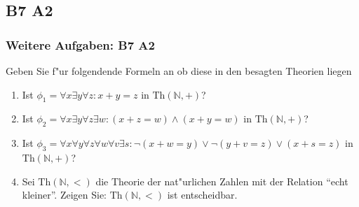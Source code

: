 \subsection{B7 A2}
\begin{frame}
	\frametitle{Weitere Aufgaben: B7 A2}
	Geben Sie f"ur folgendende Formeln an ob diese in den besagten Theorien liegen
	\begin{enumerate}
		\item Ist $\phi_1 = \forall x \exists y \forall z: x + y = z$ in $\text{Th}(\mathbb{N,+})$?
		\item Ist $\phi_2 = \forall x \exists y \forall z \exists w: (x + z = w ) \wedge (x + y = w)$  in $\text{Th}(\mathbb{N},+)$?
		\item Ist $\phi_3 = \forall x \forall y \forall z \forall w \forall v \exists s: \neg(x + w = y) \vee \neg(y + v = z) \vee (x + s = z)$ in $\text{Th}(\mathbb{N},+)$?
		\item Sei $\text{Th}(\mathbb{N},<)$ die Theorie der nat"urlichen Zahlen mit der Relation "`echt kleiner"'. Zeigen Sie: $\text{Th}(\mathbb{N},<)$ ist entscheidbar.
	\end{enumerate}
\end{frame}
